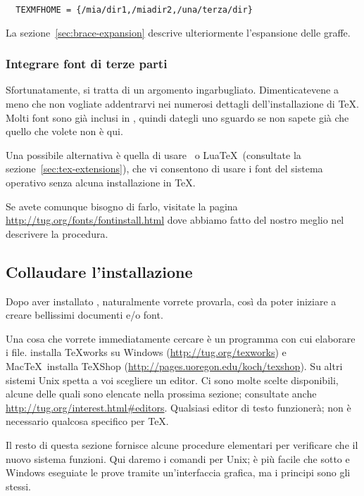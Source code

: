 \documentclass{article}
\begin{document}
\begin{verbatim}
  TEXMFHOME = {/mia/dir1,/miadir2,/una/terza/dir}
\end{verbatim}

La sezione~\ref{sec:brace-expansion} descrive ulteriormente l'espansione
delle graffe.


\subsubsection{Integrare font di terze parti}

Sfortunatamente, si tratta di un argomento ingarbugliato. Dimenticatevene
a meno che non vogliate addentrarvi nei numerosi dettagli
dell'installazione di \TeX{}. Molti font sono già inclusi in \TL, quindi
dategli uno sguardo se non sapete già che quello che volete non è qui.

Una possibile alternativa è quella di usare \XeTeX\ o Lua\TeX\ (consultate
la sezione~\ref{sec:tex-extensions}), che vi consentono di usare i font
del sistema operativo senza alcuna installazione in \TeX.

Se avete comunque bisogno di farlo, visitate la pagina
\url{http://tug.org/fonts/fontinstall.html} dove abbiamo fatto del nostro
meglio nel descrivere la procedura.


\subsection{Collaudare l'installazione}
\label{sec:test-install}

Dopo aver installato \TL, naturalmente vorrete provarla, così da poter
iniziare a creare bellissimi documenti e\slash o font.

Una cosa che vorrete immediatamente cercare è un programma con cui
elaborare i file. \TL{} installa \TeX{}works su Windows
(\url{http://tug.org/texworks}) e Mac\TeX\ installa TeXShop
(\url{http://pages.uoregon.edu/koch/texshop}). Su altri sistemi Unix
spetta a voi scegliere un editor. Ci sono molte scelte disponibili, alcune
delle quali sono elencate nella prossima sezione; consultate anche
\url{http://tug.org/interest.html#editors}. Qualsiasi editor di testo
funzionerà; non è necessario qualcosa specifico per \TeX.

Il resto di questa sezione fornisce alcune procedure elementari per verificare che il
nuovo sistema funzioni. Qui daremo i comandi per Unix; è più facile che
sotto \MacOSX e Windows eseguiate le prove tramite un'interfaccia grafica,
ma i principi sono gli stessi.
\end{document}
